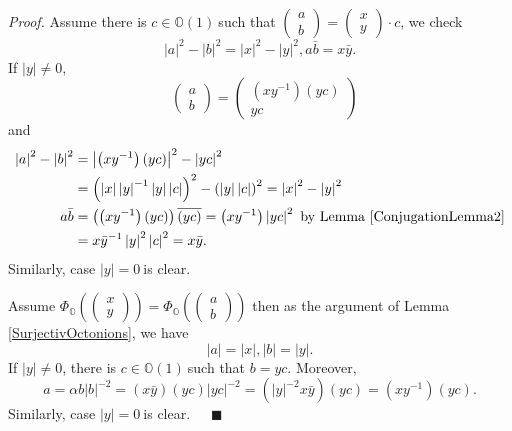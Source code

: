 \documentclass[a4paper]{article}%
\newenvironment{proof}[1][Proof]{\noindent\textit{#1.} }{}
\begin{document}
\begin{proof}
Assume there is $c\in\mathbb{O}(1)\mathbb{\ }$such that $%
\begin{pmatrix}
a\\
b
\end{pmatrix}
=%
\begin{pmatrix}
x\\
y
\end{pmatrix}
\cdot c$, we check%
\[
\left\vert a\right\vert ^{2}-\left\vert b\right\vert ^{2}=\left\vert
x\right\vert ^{2}-\left\vert y\right\vert ^{2},a\bar{b}=x\bar{y}\text{.}%
\]
If $\left\vert y\right\vert \neq0$,
\[
\text{ }%
\begin{pmatrix}
a\\
b
\end{pmatrix}
=%
\begin{pmatrix}
\left(  xy^{-1}\right)  \left(  yc\right) \\
yc
\end{pmatrix}
\]
and
\begin{align*}
\left\vert a\right\vert ^{2}-\left\vert b\right\vert ^{2}  &  =\left\vert
\left(  xy^{-1}\right)  \left(  yc\right)  \right\vert ^{2}-\left\vert
yc\right\vert ^{2}\\
&  =\left(  \left\vert x\right\vert \left\vert y\right\vert ^{-1}\left\vert
y\right\vert \left\vert c\right\vert \right)  ^{2}-\left(  \left\vert
y\right\vert \left\vert c\right\vert \right)  ^{2}=\left\vert x\right\vert
^{2}-\left\vert y\right\vert ^{2}\\
a\bar{b}  &  =\left(  \left(  xy^{-1}\right)  \left(  yc\right)  \right)
\overline{\left(  yc\right)  }=\left(  xy^{-1}\right)  \left\vert
yc\right\vert ^{2}\ \text{by Lemma \ref{ConjugationLemma2}}\\
&  =x\bar{y}^{-1}\left\vert y\right\vert ^{2}\left\vert c\right\vert
^{2}=x\bar{y}.
\end{align*}
Similarly, case $\left\vert y\right\vert =0\ $is clear.

Assume $\Phi_{\mathbb{O}}\left(
\begin{pmatrix}
x\\
y
\end{pmatrix}
\right)  =\Phi_{\mathbb{O}}\left(
\begin{pmatrix}
a\\
b
\end{pmatrix}
\right)  $ then as the argument of Lemma \ref{SurjectivOctonions}, we have
\[
\left\vert a\right\vert =\left\vert x\right\vert ,\left\vert b\right\vert
=\left\vert y\right\vert .
\]
If $\left\vert y\right\vert \neq0$, there is $c\in\mathbb{O}(1)~$such that
$b=yc$. Moreover,
\[
a=\alpha b\left\vert b\right\vert ^{-2}=\left(  x\bar{y}\right)  \left(
yc\right)  \left\vert yc\right\vert ^{-2}=\left(  \left\vert y\right\vert
^{-2}x\bar{y}\right)  \left(  yc\right)  =\left(  xy^{-1}\right)  \left(
yc\right)  \text{.}%
\]
Similarly, case $\left\vert y\right\vert =0\ $is clear.\ \ \ $\blacksquare$
\end{proof}
\end{document}
